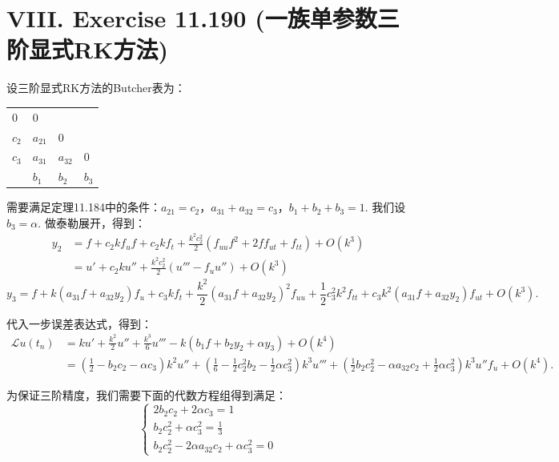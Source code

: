 \documentclass[twoside,a4paper]{article}
\begin{document}
\section*{VIII. Exercise 11.190 (一族单参数三阶显式RK方法)}

设三阶显式RK方法的Butcher表为：

\begin{table}[H]
    \centering
    \begin{tabular}{l|lll}
        $0$           & $0$           &    &  \\
        $c_2$ & $a_{21}$ & $0$ & \\
        $c_3$ & $a_{31}$ & $a_{32}$ & $0$ \\ \hline
                    & $b_1$     & $b_2$      & $b_3$
    \end{tabular}
\end{table}

需要满足定理11.184中的条件：$a_{21}=c_2$，$a_{31}+a_{32}=c_3$，$b_1+b_2+b_3=1$. 我们设$b_3=\alpha$. 做泰勒展开，得到：
\begin{align*}
    y_2&=f+c_2kf_uf+c_2kf_t+\frac{k^2c_2^2}{2}(f_{uu}f^2+2ff_{ut}+f_{tt})+O(k^3)\\
    &=u'+c_2ku''+\frac{k^2c_2^2}{2}(u'''-f_uu'')+O(k^3)
\end{align*}
\begin{equation*}
    y_3=f+k(a_{31}f+a_{32}y_2)f_u+c_3kf_t+\frac{k^2}{2}(a_{31}f+a_{32}y_2)^2f_{uu}+\frac{1}{2}c_3^2k^2f_{tt}+c_3k^2(a_{31}f+a_{32}y_2)f_{ut}+O(k^3).
\end{equation*}

代入一步误差表达式，得到：
\begin{align*}
    \mathcal{L}u(t_n)&= ku'+\frac{k^2}{2}u''+\frac{k^3}{6}u'''-k(b_1f+b_2y_2+\alpha y_3) + O(k^4)\\
    &= \left(\frac{1}{2}-b_2c_2-\alpha c_3\right)k^2u''+\left(\frac{1}{6}-\frac{1}{2}c_2^2b_2-\frac{1}{2}\alpha c_3^2\right)k^3u''' + 
    \left(\frac{1}{2}b_2c_2^2 - \alpha a_{32}c_2 + \frac{1}{2}\alpha c_3^2\right)k^3 u''f_u + O(k^4).
\end{align*}

为保证三阶精度，我们需要下面的代数方程组得到满足：
\begin{equation*}
    \left\{\begin{array}{l}
        2b_2c_2+2\alpha c_3=1\\
        b_2c_2^2+\alpha c_3^2 = \frac{1}{3}\\
        b_2c_2^2-2\alpha a_{32}c_2 + \alpha c_3^2 = 0
    \end{array}\right.
\end{equation*}
\end{document}
